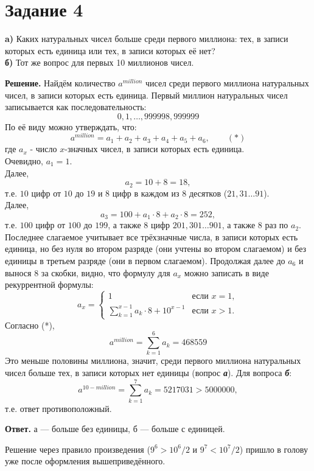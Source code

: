 \documentclass[a4paper,12pt]{article}
\begin{document}
\section*{Задание 4}
{\bf a)} Каких натуральных чисел больше среди первого миллиона: тех, в записи которых
есть единица или тех, в записи которых её нет?\\
{\bf б)} Тот же вопрос для первых 10 миллионов чисел.\par
{\noindent \bf Решение.}
Найдём количество $a^{million}$ чисел среди первого миллиона натуральных чисел, в записи которых есть единица. Первый миллион натуральных чисел записывается как последовательность:
$$0, 1, \ldots , 999998, 999999$$
По её виду можно утверждать, что:
$$a^{million} = a_1 + a_2 + a_3 + a_4 + a_5 + a_6,\qquad (*)$$ 
где $a_x$ - число $x$-значных чисел, в записи которых есть единица. \\
Очевидно, $a_1 = 1$.\\
Далее, $$a_2 = 10 + 8 = 18,$$ т.е. $10$ цифр от $10$ до $19$ и $8$ цифр в каждом из $8$ десятков ($21, 31\ldots91$).\\
Далее, $$a_3 = 100 + a_1\cdot8+a_2\cdot8=252,$$ т.е. $100$ цифр от $100$ до $199$, а также $8$ цифр $201, 301\ldots901$, а также $8$ раз по $a_2$. Последнее слагаемое учитывает все трёхзначные числа, в записи которых есть единица, но без нуля во втором разряде (они учтены во втором слагаемом) и без единицы в третьем разряде (они в первом слагаемом). Продолжая далее до $a_6$ и вынося $8$ за скобки, видно, что формулу для $a_x$ можно записать в виде рекуррентной формулы:
\begin{equation}
  a_x=\begin{cases}
    1 & \text{если $x=1$},\\
    \displaystyle\sum_{k=1}^{x-1}{a_k}\cdot8+10^{x-1} & \text{если $x>1$}.
  \end{cases}
\end{equation}
Согласно (*),
$$a^{million} = \sum_{k=1}^{6}{a_k}=468559$$
Это меньше половины миллиона, значит, среди первого миллиона натуральных чисел больше тех, в записи которых нет единицы (вопрос \textbf{\textit{а}}).
Для вопроса \textbf{\textit{б}}:
$$a^{10-million} = \sum_{k=1}^{7}{a_k}=5217031>5000000,$$
т.е. ответ противоположный.\par
{\bf Ответ.} а --- больше без единицы, б --- больше с единицей. \par

Решение через правило произведения ($9^6>10^6/2$ и $9^7<10^7/2$) пришло в голову уже после оформления вышеприведённого.
\end{document}
